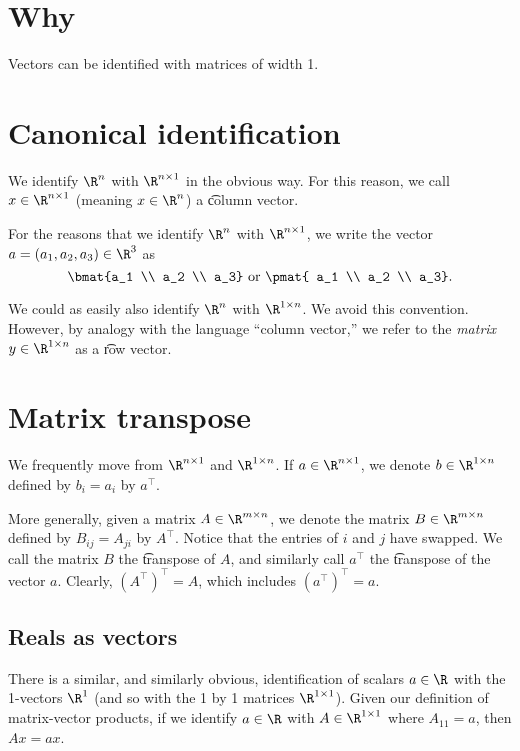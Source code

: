 
\section*{Why}

Vectors can be identified with matrices of width 1.

\section*{Canonical identification}

We identify $\R ^{n}$ with $\R ^{n \times  1}$ in the obvious way.
For this reason, we call $x \in \R ^{n \times  1}$ (meaning $x \in \R ^{n}$) a \t{column vector}.

For the reasons that we identify $\R ^n$ with $\R ^{n \times 1}$, we write the vector $a = (a_1, a_2, a_3) \in \R ^3$ as
\[
\bmat{a_1 \\ a_2 \\ a_3}
\text{ or }
\pmat{ a_1 \\ a_2 \\ a_3}.
\]

We could as easily also identify $\R ^{n}$ with $\R ^{1 \times n}$.
We avoid this convention.
However, by analogy with the language ``column vector,'' we refer to the \textit{matrix} $y \in \R ^{1 \times  n}$ as a \t{row vector}.

\section*{Matrix transpose}

We frequently move from $\R ^{n \times  1}$ and $\R ^{1 \times n}$.
If $a \in \R ^{n \times  1}$, we denote $b \in \R ^{1 \times n}$ defined by $b_i = a_i$ by $a^\top $.

More generally, given a matrix $A \in \R ^{m \times  n}$, we denote the matrix $B \in \R ^{m \times  n}$ defined by $B_{ij} = A_{ji}$ by $A^\top $.
Notice that the entries of $i$ and $j$ have swapped.
We call the matrix $B$ the \t{transpose} of $A$, and similarly call $a^\top $ the \t{transpose} of the vector $a$.
Clearly, $(A^\top )^\top  = A$, which includes $(a^\top )^\top  = a$.

\subsection*{Reals as vectors}

There is a similar, and similarly obvious, identification of scalars $a \in \R $ with the 1-vectors $\R ^{1}$ (and so with the 1 by 1 matrices $\R ^{1 \times  1}$).
Given our definition of matrix-vector products, if we identify $a \in \R $ with $A \in \R ^{1 \times  1}$ where $A_{11} = a$, then $Ax = ax$.

